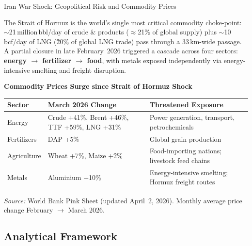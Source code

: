 ﻿\documentclass[aspectratio=1610]{beamer}
\begin{document}
\begin{frame}[shrink=15]{Iran War Shock: Geopolitical Risk and Commodity Prices}

  \small
  The Strait of Hormuz is the world's single most critical commodity choke-point:
  ${\sim}$21\,million\,bbl/day of crude \& products (${\approx}$21\% of global
  supply) plus ${\sim}$10\,bcf/day of LNG (\~20\% of global LNG trade) pass through a 33\,km-wide passage.
  A partial closure in late February~2026 triggered a cascade across four
  sectors: \textbf{energy $\to$ fertilizer $\to$ food}, with metals exposed
  independently via energy-intensive smelting and freight disruption.
  \normalsize

  \medskip
  \begin{center}
  \small
  \textbf{Commodity Prices Surge since Strait of Hormuz Shock}\\[3pt]
  \begin{tabular}{lp{3.8cm}p{4.8cm}}
    \toprule
    \textbf{Sector} & \textbf{March 2026 Change} & \textbf{Threatened Exposure} \\
    \midrule
    Energy       & Crude +41\%, Brent +46\%, TTF +59\%, LNG +31\%& Power generation, transport, petrochemicals \\
    Fertilizers  & DAP +5\%
                 & Global grain production\\
    Agriculture  & Wheat +7\%, Maize +2\%
                 & Food-importing nations; livestock feed chains \\
    Metals       & Aluminium +10\%
                 & Energy-intensive smelting; Hormuz freight routes \\
    \bottomrule
  \end{tabular}
  \end{center}

  \begin{footnotesize}
    \textit{Source:} World Bank Pink Sheet (updated April~2, 2026).
    Monthly average price change February $\to$ March 2026.
  \end{footnotesize}

\end{frame}

\subsection{Analytical Framework}
\end{document}
